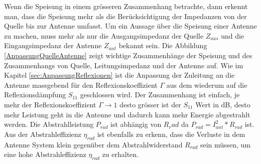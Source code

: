 Wenn die Speisung in einem grösseren Zusammenhang betrachte, dann erkennt man, dass die Speisung mehr als die Berücksichtigung der Impedanzen von der Quelle bis zur Antenne umfasst. Um ein Aussage über die Speisung einer Antenne zu machen, muss mehr als nur die Ausgangsimpedanz der Quelle $Z_{aus}$ und die Eingangsimpedanz der Antenne $Z_{ant}$ bekannt sein. Die Abbildung \ref{AnpassungQuelleAntenne} zeigt wichtige Zusammenhänge der Speisung und des Zusammenhangs von Quelle, Leitungsimpedanz und der Antenne auf. Wie im Kapitel \ref{sec:AnpassungReflexionen} ist die Anpassung der Zuleitung an die Antenne massgebend für den Reflexionskoeffizient $\Gamma$ aus dem wiederum auf die Reflexionsdämpfung $S_{11}$ geschlossen wird. Der Zusammenhang ist einfach, je mehr der Reflexionskoeffizient $\Gamma\rightarrow 1$ desto grösser ist der $S_{11}$ Wert in dB, desto mehr Leistung geht in die Antenne und dadurch kann mehr Energie abgestrahlt werden. Die Abstrahlleistung $P_{rad}$ ist abhängig von $R_rad$ da $P_{rad}=I_{ant}^2*R_{rad}$ ist. Aus der Abstrahleffizienz $\eta_{rad}$ ist ebenfalls zu erkenn, dass die Verluste in dem Antenne System klein gegenüber dem Abstrahlwiderstand $R_{rad}$ sein müssen, um eine hohe Abstrahleffizienz $\eta_{rad}$ zu erhalten.


